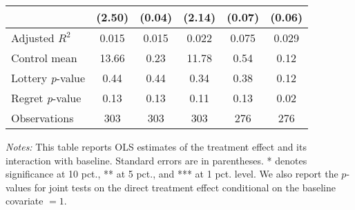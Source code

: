 \begin{table}[h]
{\begin{threeparttable}
\begin{tabular}{l*{5}{c}}
                &   (2.50)         &   (0.04)         &   (2.14)         &   (0.07)         &   (0.06)         \\
\midrule
Adjusted \(R^{2}\)&    0.015         &    0.015         &    0.022         &    0.075         &    0.029         \\
Control mean    &    13.66         &     0.23         &    11.78         &     0.54         &     0.12         \\
Lottery \emph{p}-value&     0.44         &     0.44         &     0.34         &     0.38         &     0.12         \\
Regret \emph{p}-value&     0.13         &     0.13         &     0.11         &     0.13         &     0.02         \\
Observations    &      303         &      303         &      303         &      276         &      276         \\
\bottomrule \end{tabular} \begin{tablenotes}[flushleft] \footnotesize \item \emph{Notes:} This table reports OLS estimates of the treatment effect and its interaction with baseline. Standard errors are in parentheses. * denotes significance at 10 pct., ** at 5 pct., and *** at 1 pct. level. We also report the \(p\)-values for joint tests on the direct treatment effect conditional on the baseline covariate $= 1$. \end{tablenotes} \end{threeparttable} } \end{table}

